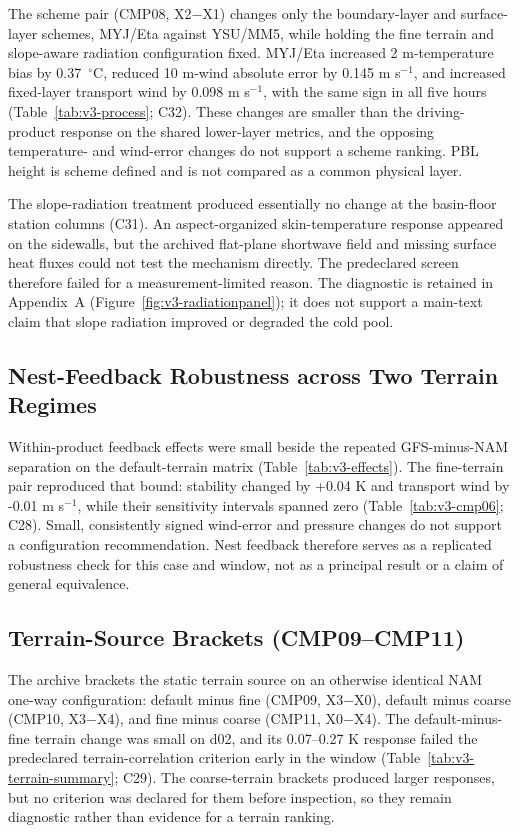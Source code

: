 \documentclass[air,article,submit,moreauthors]{Definitions/mdpi}
\begin{document}
The scheme pair (CMP08, X2$-$X1) changes only the boundary-layer and surface-layer schemes, MYJ/Eta against YSU/MM5, while holding the fine terrain and slope-aware radiation configuration fixed.
MYJ/Eta increased 2 m-temperature bias by 0.37~$^{\circ}$C, reduced 10 m-wind absolute error by 0.145 m s$^{-1}$, and increased fixed-layer transport wind by 0.098 m s$^{-1}$, with the same sign in all five hours (Table~\ref{tab:v3-process}; C32).
These changes are smaller than the driving-product response on the shared lower-layer metrics, and the opposing temperature- and wind-error changes do not support a scheme ranking.
PBL height is scheme defined and is not compared as a common physical layer.

The slope-radiation treatment produced essentially no change at the basin-floor station columns (C31).
An aspect-organized skin-temperature response appeared on the sidewalls, but the archived flat-plane shortwave field and missing surface heat fluxes could not test the mechanism directly.
The predeclared screen therefore failed for a measurement-limited reason.
The diagnostic is retained in Appendix~A (Figure~\ref{fig:v3-radiationpanel}); it does not support a main-text claim that slope radiation improved or degraded the cold pool.

\subsection{Nest-Feedback Robustness across Two Terrain Regimes}
\label{sec:v3-feedback}

\label{sec:v3-cmp06}
Within-product feedback effects were small beside the repeated GFS-minus-NAM separation on the default-terrain matrix (Table~\ref{tab:v3-effects}).
The fine-terrain pair reproduced that bound: stability changed by +0.04 K and transport wind by -0.01 m s$^{-1}$, while their sensitivity intervals spanned zero (Table~\ref{tab:v3-cmp06}; C28).
Small, consistently signed wind-error and pressure changes do not support a configuration recommendation.
Nest feedback therefore serves as a replicated robustness check for this case and window, not as a principal result or a claim of general equivalence.

\subsection{Terrain-Source Brackets (CMP09--CMP11)}
\label{sec:v3-terrain}

The archive brackets the static terrain source on an otherwise identical NAM one-way configuration: default minus fine (CMP09, X3$-$X0), default minus coarse (CMP10, X3$-$X4), and fine minus coarse (CMP11, X0$-$X4).
The default-minus-fine terrain change was small on d02, and its 0.07--0.27 K response failed the predeclared terrain-correlation criterion early in the window (Table~\ref{tab:v3-terrain-summary}; C29).
The coarse-terrain brackets produced larger responses, but no criterion was declared for them before inspection, so they remain diagnostic rather than evidence for a terrain ranking.
\end{document}
